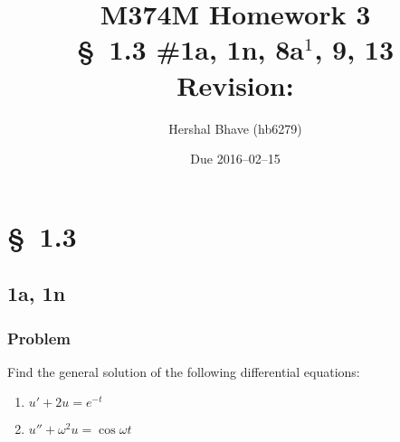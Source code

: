 \documentclass[12pt,twoside]{article}
\title{M374M Homework 3 \\
  \normalsize{\S~1.3 \#1a, 1n, 8a$^1$, 9, 13} \\
  Revision: }
\author{Hershal Bhave (hb6279)}
\date{Due 2016--02--15}
\begin{document}
\maketitle

\section{\S~1.3}
\subsection{1a, 1n}
\subsubsection*{Problem}
Find the general solution of the following differential equations:
\begin{enumerate}
\item $u'+2u=e^{-t}$
\item $u''+\omega^2u=\cos\omega t$
\end{enumerate}
\end{document}
